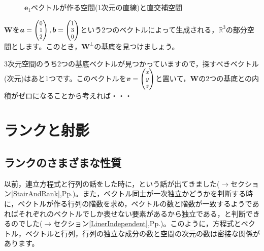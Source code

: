 \documentclass{ltjsbook}
\begin{document}
\begin{figure}
	\centering
	\caption{$\bm{e}_1$ベクトルが作る空間(1次元の直線)と直交補空間}
	\label{orthogonalComplement}
\end{figure}
\begin{reidai}{}{}
	$\bm{W}$を$\bm{a} = \footnotesize\begin{pmatrix}0 \\ 1 \\ 2\end{pmatrix},\bm{b}=\footnotesize\begin{pmatrix}1\\3\\0\end{pmatrix}$という2つのベクトルによって生成される，$\mathbb{R}^3$の部分空間とします。このとき，$\bm{W}^{\perp}$の基底を見つけましょう。
\end{reidai}

\begin{hinto}{}{}
	3次元空間のうち2つの基底ベクトルが見つかっていますので，探すべきベクトル(次元)はあと1つです。このベクトルを$\bm{v}=\footnotesize\begin{pmatrix}x\\y\\z\end{pmatrix}$と置いて，$\bm{W}$の2つの基底との内積がゼロになることから考えれば・・・
\end{hinto}
\section{ランクと射影}
\subsection{ランクのさまざまな性質}
以前，連立方程式と行列の話をした時に，という話が出てきました($\to$セクション\ref{StairAndRank},Pp.\pageref{StairAndRank})。また，ベクトル同士が一次独立かどうかを判断する時に，ベクトルが作る行列の階数を求め，ベクトルの数と階数が一致するようであればそれぞれのベクトルでしか表せない要素があるから独立である，と判断できるのでした($\to$セクション\ref{LinerIndependent},Pp.\pageref{LinerIndependent})。このように，方程式とベクトル，ベクトルと行列，行列の独立な成分の数と空間の次元の数は密接な関係があります。
\end{document}
